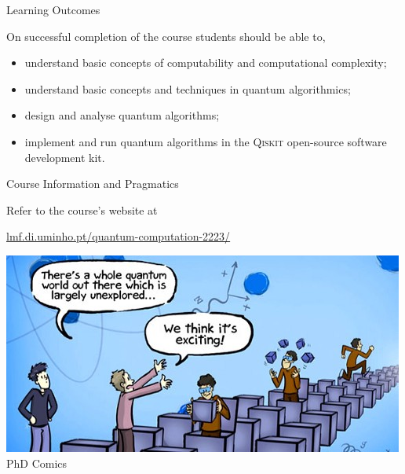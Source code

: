 \documentclass{beamer}
\begin{document}
\begin{frame}{Learning Outcomes}

On successful completion of the course students should be able to,

\begin{itemize}
\item understand basic concepts of computability and computational complexity;
\item understand basic concepts and techniques in quantum algorithmics;
\item design and analyse quantum algorithms;
\item implement and run quantum algorithms in the \alert{\textsc{Qiskit}} 
        open-source software development kit.
\end{itemize}

\end{frame}

\begin{frame}{Course Information and Pragmatics}

\begin{block}{Refer to the course's website at}
\begin{center}
        \url{lmf.di.uminho.pt/quantum-computation-2223/}
\end{center}
\end{block}

\end{frame}

\begin{frame}[plain]
        \centering
        \includegraphics[scale=0.5]{images/mot.jpg} \\
        \tiny{PhD Comics}
\end{frame}
\end{document}
